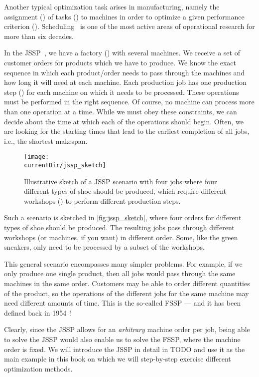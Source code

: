 %
%
\label{sec:jsspExample}%
%
Another typical optimization task arises in manufacturing, namely the assignment () of tasks () to machines in order to optimize a given performance criterion ().
Scheduling~\cite{P2016STAAS,PS2009FYOSASOM} is one of the most active areas of operational research for more than  six decades.

In the \acrfull{JSSP}~\cite{CGLL1995STAIA,GLLRK1979OAAIDSASAS,LLRKS1993SASAAC,L1982RRITTOMS,T1993BFBSP,BDP1996TJSSPCANST}, we have a factory () with several machines.
We receive a set of customer orders for products which we have to produce.
We know the exact sequence in which each product/order needs to pass through the machines and how long it will need at each machine.
Each production job has one production step () for each machine on which it needs to be processed.
These operations must be performed in the right sequence.
Of course, no machine can process more than one operation at a time.
While we must obey these constraints, we can decide about the time at which each of the operations should begin.
Often, we are looking for the starting times that lead to the earliest completion of all jobs, i.e., the shortest makespan.

\begin{figure}%
\centering%
\texttt{[image: \\currentDir/jssp\_sketch]}%
\caption{Illustrative sketch of a \acrfull{JSSP} scenario with four jobs where four different types of shoe should be produced, which require different workshops () to perform different production steps.}%
\label{fig:jssp_sketch}%
\end{figure}%
%
Such a scenario is sketched in \autoref{fig:jssp_sketch}, where four orders for different types of shoe should be produced.
The resulting jobs pass through different workshops (or machines, if you want) in different order.
Some, like the green sneakers, only need to be processed by a subset of the workshops.

This general scenario encompasses many simpler problems.
For example, if we only produce one single product, then all jobs would pass through the same machines in the same order.
Customers may be able to order different quantities of the product, so the operations of the different jobs for the same machine may need different amounts of time.
This is the so-called \acrfull{FSSP} --- and it has been defined back in 1954~\cite{J1954OTATSPSWSTI}!

Clearly, since the \gls{JSSP} allows for an \emph{arbitrary} machine order per job, being able to solve the \gls{JSSP} would also enable us to solve the FSSP, where the machine order is fixed.
We will introduce the \gls{JSSP} in detail in TODO and use it as the main example in this book on which we will step-by-step exercise different optimization methods.%
\endhsection%
%
